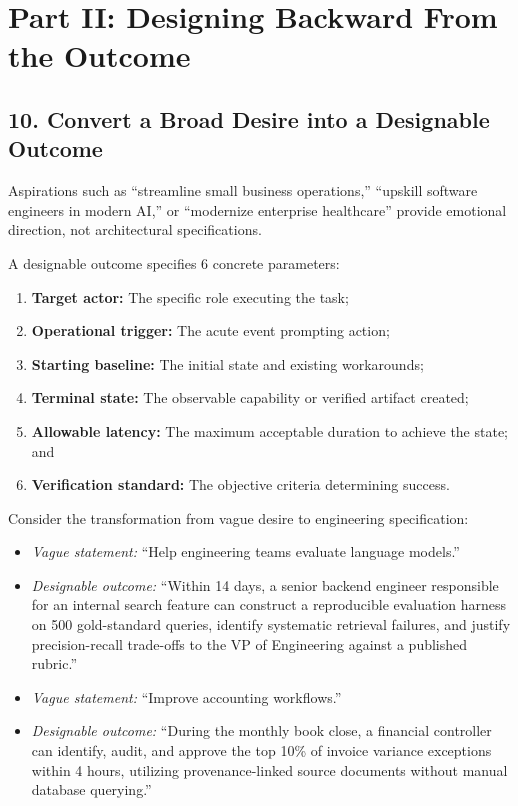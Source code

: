 \section*{Part II: Designing Backward From the Outcome}

\subsection*{10. Convert a Broad Desire into a Designable Outcome}

Aspirations such as ``streamline small business operations,'' ``upskill software engineers in modern AI,'' or ``modernize enterprise healthcare'' provide emotional direction, not architectural specifications.

A designable outcome specifies 6 concrete parameters:
\begin{enumerate}
    \item \textbf{Target actor:} The specific role executing the task;
    \item \textbf{Operational trigger:} The acute event prompting action;
    \item \textbf{Starting baseline:} The initial state and existing workarounds;
    \item \textbf{Terminal state:} The observable capability or verified artifact created;
    \item \textbf{Allowable latency:} The maximum acceptable duration to achieve the state; and
    \item \textbf{Verification standard:} The objective criteria determining success.
\end{enumerate}

Consider the transformation from vague desire to engineering specification:
\begin{itemize}
    \item \emph{Vague statement:} ``Help engineering teams evaluate language models.''
    \item \emph{Designable outcome:} ``Within 14 days, a senior backend engineer responsible for an internal search feature can construct a reproducible evaluation harness on 500 gold-standard queries, identify systematic retrieval failures, and justify precision-recall trade-offs to the VP of Engineering against a published rubric.''
    \item \emph{Vague statement:} ``Improve accounting workflows.''
    \item \emph{Designable outcome:} ``During the monthly book close, a financial controller can identify, audit, and approve the top 10\% of invoice variance exceptions within 4 hours, utilizing provenance-linked source documents without manual database querying.''
\end{itemize}

